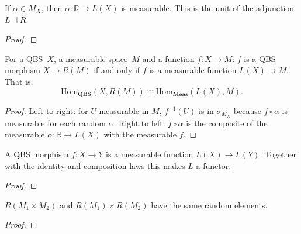 \begin{lemma}\label{lem:qbs_Mx_measurable}
  \rocqok
  If $\alpha \in M_X$, then $\alpha : \mathbb{R} \to L(X)$ is measurable.
  This is the unit of the adjunction $L \dashv R$.
\end{lemma}
\begin{proof}\rocqok\end{proof}

\begin{theorem}\label{thm:qbs_morphism_measurableP}
  \rocqok
  For a QBS~$X$, a measurable space~$M$ and a function $f : X \to M$:
  $f$ is a QBS morphism $X \to R(M)$ if and only if $f$ is a measurable
  function $L(X) \to M$. That is,
  \[
    \mathrm{Hom}_{\mathbf{QBS}}(X, R(M)) \cong
    \mathrm{Hom}_{\mathbf{Meas}}(L(X), M).
  \]
\end{theorem}
\begin{proof}
  \rocqok
  Left to right: for $U$ measurable in $M$, $f^{-1}(U)$ is in
  $\sigma_{M_X}$ because $f \circ \alpha$ is measurable for each random
  $\alpha$. Right to left: $f \circ \alpha$ is the composite of the
  measurable $\alpha : \mathbb{R} \to L(X)$ with the measurable $f$.
\end{proof}

\begin{lemma}[L on Morphisms]\label{lem:qbs_morphism_measurable}
  \rocqok
  A QBS morphism $f : X \to Y$ is a measurable function
  $L(X) \to L(Y)$. Together with the identity and composition laws this
  makes $L$ a functor.
\end{lemma}
\begin{proof}\rocqok\end{proof}

\begin{lemma}\label{lem:qbs_Mx_R_qbs_prod}
  \rocqok
  $R(M_1 \times M_2)$ and $R(M_1) \times R(M_2)$ have the same random
  elements.
\end{lemma}
\begin{proof}\rocqok\end{proof}

